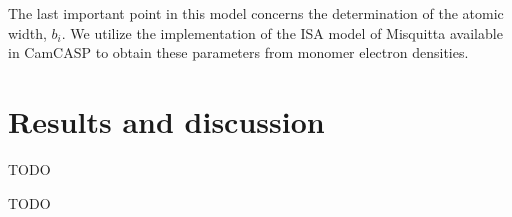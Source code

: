 \documentclass[journal=jacsat,manuscript=article]{achemso}
\begin{document}
The last important point in this model concerns the determination of the
atomic width, $b_i$. We utilize the implementation of the ISA model of
Misquitta\cite{misquitta2014distributed} available in CamCASP\cite{misquitta2016ab}
to obtain these parameters from monomer electron densities.

\section{Results and discussion}



\begin{acknowledgement}

TODO

\end{acknowledgement}

\begin{suppinfo}

TODO

\end{suppinfo}


\end{document}
